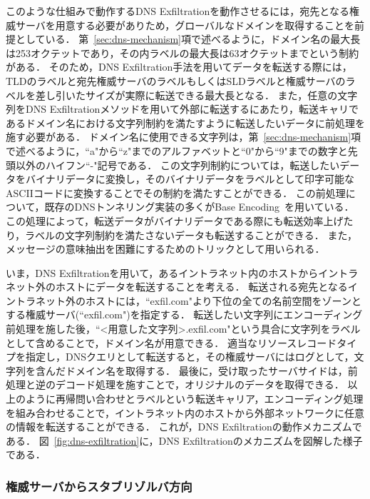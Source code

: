 このような仕組みで動作するDNS Exfiltrationを動作させるには，宛先となる権威サーバを用意する必要がありため，グローバルなドメインを取得することを前提としている．
第~\ref{sec:dns-mechanism}項で述べるように，ドメイン名の最大長は253オクテットであり，その内ラベルの最大長は63オクテットまでという制約がある．
そのため，DNS Exfiltration手法を用いてデータを転送する際には，TLDのラベルと宛先権威サーバのラベルもしくはSLDラベルと権威サーバのラベルを差し引いたサイズが実際に転送できる最大長となる．
また，任意の文字列をDNS Exfiltrationメソッドを用いて外部に転送するにあたり，転送キャリであるドメイン名における文字列制約を満たすように転送したいデータに前処理を施す必要がある．
ドメイン名に使用できる文字列は，第~\ref{sec:dns-mechanism}項で述べるように，``a"から``z"までのアルファベットと``0"から``9"までの数字と先頭以外のハイフン``-"記号である．
この文字列制約については，転送したいデータをバイナリデータに変換し，そのバイナリデータをラベルとして印字可能なASCIIコードに変換することでその制約を満たすことができる．
この前処理について，既存のDNSトンネリング実装の多くがBase Encoding~\cite{rfc4648}を用いている．
この処理によって，転送データがバイナリデータである際にも転送効率上げたり，ラベルの文字列制約を満たさないデータも転送することができる．
また，メッセージの意味抽出を困難にするためのトリックとして用いられる．

いま，DNS Exfiltrationを用いて，あるイントラネット内のホストからイントラネット外のホストにデータを転送することを考える．
転送される宛先となるイントラネット外のホストには，``exfil.com"より下位の全ての名前空間をゾーンとする権威サーバ(``exfil.com")を指定する．
転送したい文字列にエンコーディング前処理を施した後，``<用意した文字列>.exfil.com"という具合に文字列をラベルとして含めることで，ドメイン名が用意できる．
適当なリソースレコードタイプを指定し，DNSクエリとして転送すると，その権威サーバにはログとして，文字列を含んだドメイン名を取得する．
最後に，受け取ったサーバサイドは，前処理と逆のデコード処理を施すことで，オリジナルのデータを取得できる．
以上のように再帰問い合わせとラベルという転送キャリア，エンコーディング処理を組み合わせることで，イントラネット内のホストから外部ネットワークに任意の情報を転送することができる．
これが，DNS Exfiltrationの動作メカニズムである．
図~\ref{fig:dns-exfiltration}に，DNS Exfiltrationのメカニズムを図解した様子である．



\subsubsection{権威サーバからスタブリゾルバ方向}
\label{sec:dns-infiltration}

